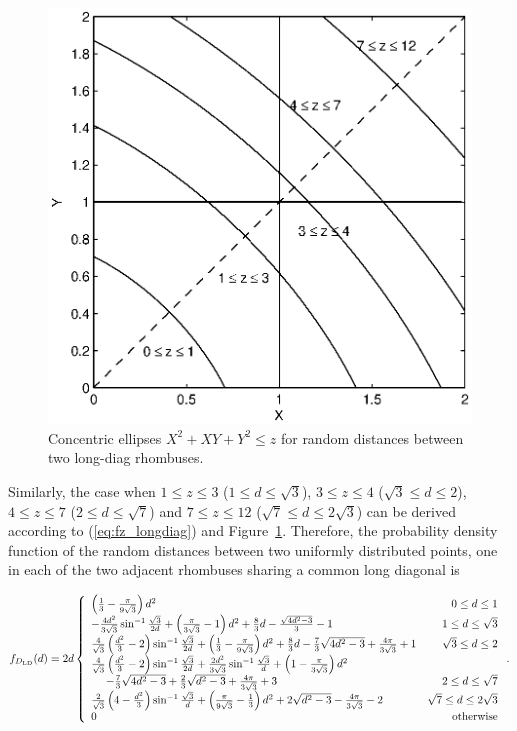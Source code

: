 \documentclass[12pt,draftclsnofoot,onecolumn]{IEEEtran}
\begin{document}
\begin{figure}
  \centering
  \includegraphics[width=0.5\columnwidth]{fig/rhombus_diag1}
  \caption{Concentric ellipses $X^2+XY+Y^2 \leq z$ for random distances between two long-diag rhombuses.}
  \label{fig:diag1}
\end{figure}

Similarly, the case when $1 \leq z \leq 3$ ($1\leq d\leq \sqrt{3}$),
$3 \leq z \leq 4$ ($\sqrt{3}\leq d\leq 2$), $4 \leq z \leq 7$ ($2\leq d\leq 
\sqrt{7}$) and $7 \leq z \leq 12$ ($\sqrt{7}\leq d\leq 2\sqrt{3}$) can
be derived according to (\ref{eq:fz_longdiag}) and Figure~\ref{fig:diag1}. 
Therefore, the probability density function of the random distances between two
uniformly distributed points, one in each of the two adjacent rhombuses sharing
a common long diagonal is
\begin{small}
\begin{equation}\label{eq:fd_r_diag1}
  f_{D_{\rm LD}}(d)=2d\left\{
    \begin{array}{lr}

\left(\frac{1}{3}-\frac{\pi}{9\sqrt{3}}\right)d^2 & 0\leq d\leq 1\\

-\frac{4d^2}{3\sqrt{3}}\sin^{-1}\frac{\sqrt{3}}{2d}+\left(\frac{\pi}{3\sqrt{3}}
-1\right)d^2+\frac{8}{3}d-\frac{\sqrt{4d^2-3}}{3}-1 & 1\leq d\leq \sqrt{3}\\

\frac{4}{\sqrt{3}}\left(\frac{d^2}{3}-2\right)\sin^{-1}\frac{\sqrt{3
}}{2d}+\left(\frac{1}{3}-\frac{\pi}{9\sqrt{3}}\right)d^2+\frac{8}{3}d-\frac{7}{3
}\sqrt{4d^2-3}+\frac{4\pi}{3\sqrt{3}}+1 & \sqrt{3}\leq d\leq 2\\

\frac{4}{\sqrt{3}}\left(\frac{d^2}{3}-2\right)\sin^{-1}\frac{\sqrt{3
}}{2d}+\frac{2d^2}{3\sqrt{3}}\sin^{-1}\frac{\sqrt{3}}{d}+\left(1-\frac{\pi}{
3\sqrt{3}}\right)d^2 \\
~~~~-\frac{7}{3}\sqrt{4d^2-3}+\frac{2}{3}\sqrt{d^2-3}+\frac{4\pi}{3\sqrt{3}}+3 &
2\leq d\leq \sqrt{7} \\

\frac{2}{\sqrt{3}}\left(4-\frac{d^2}{3}\right)\sin^{-1}\frac{\sqrt{3}}{d}
+\left(\frac{\pi}{9\sqrt{3}}-\frac{1}{3}\right)d^2+2\sqrt{d^2-3}-\frac{4\pi}{
3\sqrt{3}}-2 & \sqrt{7} \leq d \leq 2\sqrt{3} \\

      0 & {\rm otherwise}
    \end{array}
  \right..
\end{equation}
\end{small}
\end{document}
